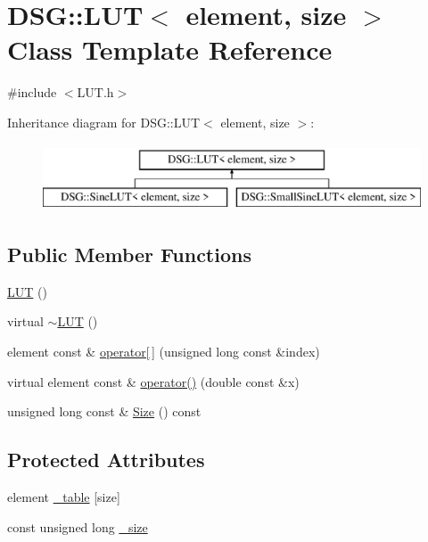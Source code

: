 \hypertarget{classDSG_1_1LUT}{\section{D\+S\+G\+:\+:L\+U\+T$<$ element, size $>$ Class Template Reference}
\label{classDSG_1_1LUT}
}


{\ttfamily \#include $<$L\+U\+T.\+h$>$}

Inheritance diagram for D\+S\+G\+:\+:L\+U\+T$<$ element, size $>$\+:\begin{figure}[H]
\begin{center}
\leavevmode
\includegraphics[height=2.000000cm]{classDSG_1_1LUT}
\end{center}
\end{figure}
\subsection*{Public Member Functions}
\begin{DoxyCompactItemize}
\item 
\hyperlink{classDSG_1_1LUT_a9d172f92fe9ea296efce54c9d7f8fdcc}{L\+U\+T} ()
\item 
virtual \hyperlink{classDSG_1_1LUT_aa1de688bc34eaa57e19e794fa505e249}{$\sim$\+L\+U\+T} ()
\item 
element const \& \hyperlink{classDSG_1_1LUT_a5f3bc252bd650fae13046e7959b94f81}{operator\mbox{[}$\,$\mbox{]}} (unsigned long const \&index)
\item 
virtual element const \& \hyperlink{classDSG_1_1LUT_a131c3cf974754270699fdcda74f2e694}{operator()} (double const \&x)
\item 
unsigned long const \& \hyperlink{classDSG_1_1LUT_a2d1a2112f9e960c7b70882a19d670ff9}{Size} () const 
\end{DoxyCompactItemize}
\subsection*{Protected Attributes}
\begin{DoxyCompactItemize}
\item 
element \hyperlink{classDSG_1_1LUT_ac8b23bbb7ce259d4ceb1c6fa93a7f29f}{\+\_\+table} \mbox{[}size\mbox{]}
\item 
const unsigned long \hyperlink{classDSG_1_1LUT_a87c352b5eaea2188955213c0f4ae9799}{\+\_\+size}
\end{DoxyCompactItemize}


